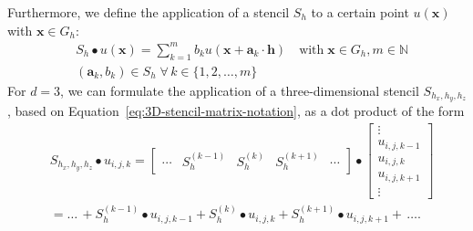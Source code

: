 Furthermore, we define the application of a stencil $S_h$ to a certain point $u(\bm x)$ with $\bm x \in G_h$:
\begin{equation}
	\begin{split}
		& S_h \bullet u(\bm{x}) = \sum_{k=1}^m b_k u({\bm x + \bm{a}_k} \cdot \bm{h}) \quad 
		\text{with} \; \bm{x} \in G_h, m \in \mathbb{N} \\ & (\bm{a}_k, b_k) \in S_h \; \forall \, k \in \{ 1, 2, \dots, m \}
	\end{split}
\label{eq:stencil-application}
\end{equation}
For $d = 3$, we can formulate the application of a three-dimensional stencil $S_{h_x, h_y, h_z}$, based on Equation~\eqref{eq:3D-stencil-matrix-notation}, as a dot product of the form
\begin{equation}
	\begin{split}
	& S_{h_x, h_y, h_z} \bullet u_{i,j,k} = 	
	\begin{bmatrix}
	\cdots & S_{h}^{(k-1)} & S_{h}^{(k)} & S_{h}^{(k+1)} & \cdots 
	\end{bmatrix} \bullet
	\begin{bmatrix}
	\vdots \\ u_{i,j,k-1} \\ u_{i,j,k} \\ u_{i,j,k+1} \\ \vdots 
	\end{bmatrix} \\
	& = \dots \, + S_{h}^{(k-1)} \bullet u_{i,j,k-1} + S_{h}^{(k)} \bullet u_{i,j,k} + S_{h}^{(k+1)} \bullet u_{i,j,k+1} + \, \dots .
	\end{split}
\end{equation}

